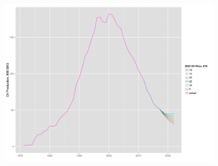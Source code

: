 \documentclass{beamer}
\begin{document}
\begin{frame}[plain]
	\begin{figure}
		\includegraphics[width=.8\textwidth]{tot_forecast.png}
		\caption{}
		\label{tot_forecast}
	\end{figure}

\end{frame}





\begin{frame}[plain]

\end{frame}
\end{document}
